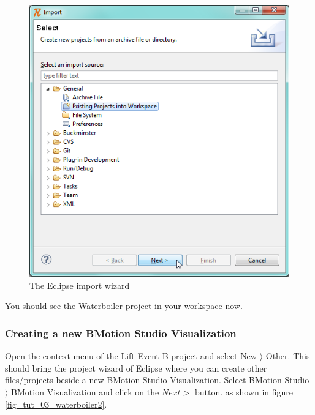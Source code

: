 \begin{figure}[!h]
\begin{center}
	\includegraphics{img/tutorial/tut_03_waterboiler1.png}
	\caption{The Eclipse import wizard}
	\label{fig_tut_03_waterboiler1}
\end{center}
\end{figure}

You should see the Waterboiler project in your workspace now.

\subsubsection{Creating a new BMotion Studio Visualization}

Open the context menu of the Lift Event B project and select \textsf{New $\rangle$ Other}. This should bring the project wizard of Eclipse where you can create other files/projects beside a new BMotion Studio Visualization. Select \textsf{BMotion Studio $\rangle$ BMotion Visualization} and click on the \textsf{$Next >$} button. as shown in figure \ref{fig_tut_03_waterboiler2}. 

